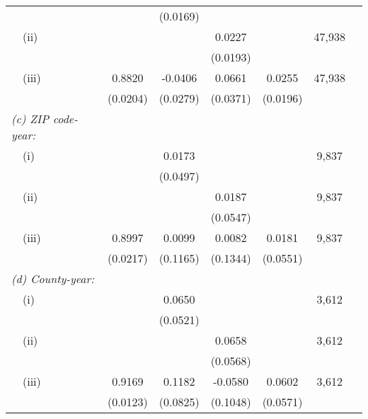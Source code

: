 \begin{table}
\begin{tabular}{@{}lcccccc@{}}
                                                             &       & (0.0169) &       &       &      \\
        $\quad$(ii)                                          &       &       &  0.0227  &       & 47,938 \\
                                                             &       &       & (0.0193) &       &      \\
        $\quad$(iii)                                         &  0.8820  &  -0.0406  &  0.0661  &  0.0255  & 47,938 \\
                                                             & (0.0204) & (0.0279) & (0.0371) & (0.0196) &      \\
        \textit{(c) ZIP code-year:}                          &       &       &       &       &      \\
        $\quad$(i)                                           &       &  0.0173  &       &       & 9,837 \\
                                                             &       & (0.0497) &       &       &      \\
        $\quad$(ii)                                          &       &       &  0.0187  &       & 9,837 \\
                                                             &       &       & (0.0547) &       &      \\
        $\quad$(iii)                                         &  0.8997  &  0.0099  &  0.0082  &  0.0181  & 9,837 \\
                                                             & (0.0217) & (0.1165) & (0.1344) & (0.0551) &      \\
         \textit{(d) County-year:}                           &       &       &       &       &      \\
        $\quad$(i)                                           &       &  0.0650  &       &       & 3,612 \\
                                                             &       & (0.0521) &       &       &      \\
        $\quad$(ii)                                          &       &       &  0.0658  &       & 3,612 \\
                                                             &       &       & (0.0568) &       &      \\
        $\quad$(iii)                                         &  0.9169  &  0.1182  &  -0.0580  &  0.0602  & 3,612 \\
                                                             & (0.0123) & (0.0825) & (0.1048) & (0.0571) &      \\ \bottomrule
    \end{tabular}


\end{table}
